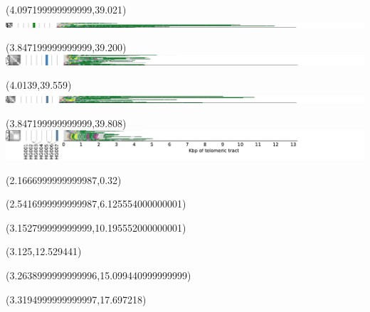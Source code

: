 \documentclass{article}
\begin{document}
\begin{textblock}{13}(4.097199999999999,39.021)\includegraphics{haplotypes-constrained/chrX-HG004.pdf}\end{textblock}
\begin{textblock}{13}(3.847199999999999,39.200)\includegraphics{haplotypes-constrained/chrX-HG005.pdf}\end{textblock}
\begin{textblock}{13}(4.0139,39.559)\includegraphics{haplotypes-constrained/chrX-HG006.pdf}\end{textblock}
\begin{textblock}{13}(3.847199999999999,39.808)\includegraphics{haplotypes-constrained/chrX-HG007.pdf}\end{textblock}
\begin{textblock}{13}(2.1666999999999987,0.32)\end{textblock}
\begin{textblock}{13}(2.5416999999999987,6.125554000000001)\end{textblock}
\begin{textblock}{13}(3.152799999999999,10.195552000000001)\end{textblock}
\begin{textblock}{13}(3.125,12.529441)\end{textblock}
\begin{textblock}{13}(3.2638999999999996,15.099440999999999)\end{textblock}
\begin{textblock}{13}(3.3194999999999997,17.697218)\end{textblock}
\end{document}
